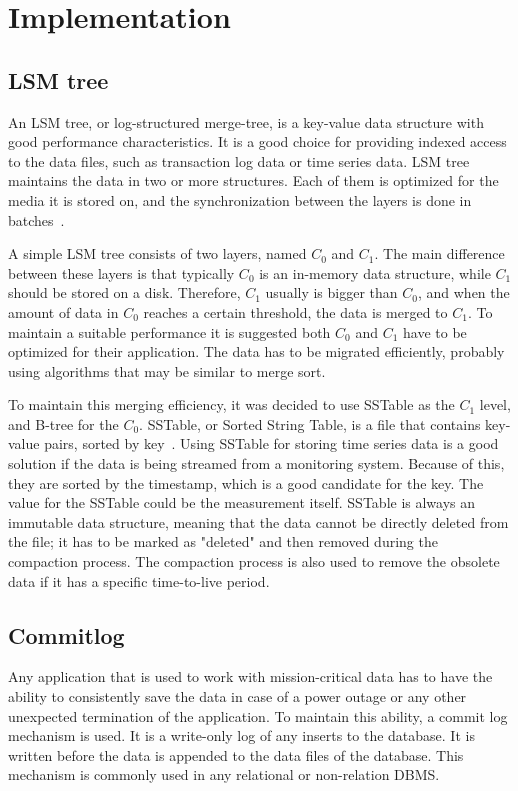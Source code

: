 \section{Implementation}
\subsection{LSM tree}
An LSM tree, or log-structured merge-tree, is a key-value data structure with good performance characteristics. It is a good choice for providing indexed access to the data files, such as transaction log data or time series data. LSM tree maintains the data in two or more structures. Each of them is optimized for the media it is stored on, and the synchronization between the layers is done in batches~\cite{lsm_tree_orig}.

A simple LSM tree consists of two layers, named $C_0$ and $C_1$. The main difference between these layers is that typically $C_0$ is an in-memory data structure, while $C_1$ should be stored on a disk. Therefore, $C_1$ usually is bigger than $C_0$, and when the amount of data in $C_0$ reaches a certain threshold, the data is merged to $C_1$. To maintain a suitable performance it is suggested both $C_0$ and $C_1$ have to be optimized for their application. The data has to be migrated efficiently, probably using algorithms that may be similar to merge sort.

To maintain this merging efficiency, it was decided to use SSTable as the $C_1$ level, and B-tree for the $C_0$. SSTable, or Sorted String Table, is a file that contains key-value pairs, sorted by key~\cite{sstable}. Using SSTable for storing time series data is a good solution if the data is being streamed from a monitoring system. Because of this, they are sorted by the timestamp, which is a good candidate for the key. The value for the SSTable could be the measurement itself. SSTable is always an immutable data structure, meaning that the data cannot be directly deleted from the file; it has to be marked as "deleted" and then removed during the compaction process. The compaction process is also used to remove the obsolete data if it has a specific time-to-live period.

\subsection{Commitlog}
Any application that is used to work with mission-critical data has to have the ability to consistently save the data in case of a power outage or any other unexpected termination of the application. To maintain this ability, a commit log mechanism is used. It is a write-only log of any inserts to the database. It is written before the data is appended to the data files of the database. This mechanism is commonly used in any relational or non-relation DBMS.

